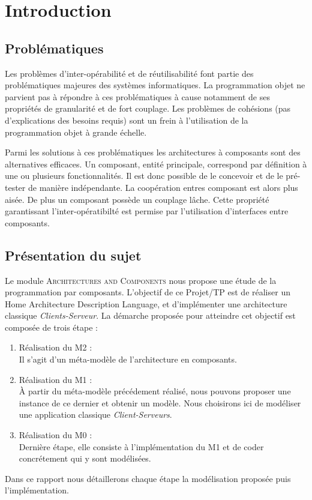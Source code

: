 \chapter{Introduction}

\section{Problématiques}
Les problèmes d'inter-opérabilité et de réutilisabilité font partie des problématiques majeures des systèmes informatiques. La programmation objet ne parvient pas à répondre à ces problématiques à cause notamment de ses propriétés de granularité et de fort couplage. Les problèmes de cohésions (pas d'explications des besoins requis) sont un frein à l'utilisation de la programmation objet à grande échelle. 

Parmi les solutions à ces problématiques les architectures à composants sont des alternatives efficaces. Un composant, entité principale, correspond par définition à une ou plusieurs fonctionnalités. Il est donc possible de le concevoir et de le pré-tester de manière indépendante. La coopération entres composant est alors plus aisée. De plus un composant possède un couplage lâche. Cette propriété garantissant l'inter-opératibilté est permise par l'utilisation d'interfaces entre composants. 

\section{Présentation du sujet}
Le module \textsc{Architectures and Components} nous propose une étude de la programmation par composants. L'objectif de ce Projet/TP  est de réaliser un Home Architecture Description Language, et d'implémenter une architecture classique \emph{Clients-Serveur}. La démarche proposée pour atteindre cet objectif est composée de trois étape : 


\begin{enumerate}
\item 
Réalisation du M2 :\hfill \\
Il s'agit d'un méta-modèle de l'architecture en composants.  
\item
Réalisation du M1 :\hfill \\
À partir du méta-modèle précédement réalisé, nous pouvons proposer une instance de ce dernier et obtenir un modèle. Nous choisirons ici de modéliser une application classique \emph{Client-Serveurs}.  
\item
Réalisation du M0 :\hfill \\
Dernière étape, elle consiste à l'implémentation du M1 et de coder concrétement qui y sont modélisées.
\end{enumerate}

Dans ce rapport nous détaillerons chaque étape la modélisation proposée puis l'implémentation.

